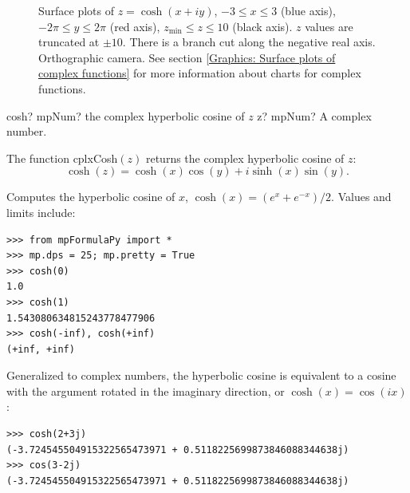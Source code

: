 \begin{figure}[ht]%
	\centering
	\qquad
	\caption[Complex Hyperbolic Cosine]{Surface plots of $z = \cosh(x + iy)$, $-3 \leq x \leq 3$ (blue axis), $-2 \pi \leq y \leq 2\pi$ (red axis), $z_{\text{min}} \leq z \leq 10$ (black axis). $z$ values are truncated at $\pm 10$. There is a branch cut along the negative real axis. Orthographic camera. See section \ref{Graphics: Surface plots of complex functions} for more information about charts for complex functions.} 
	\label{fig:Complex Hyperbolic Cosine}%
\end{figure}


\begin{mpFunctionsExtract}
	\mpFunctionOne
	{cosh? mpNum? the complex hyperbolic cosine of $z$}
	{z? mpNum? A complex number.}
\end{mpFunctionsExtract}

\vspace{0.3cm}
The function \textsf{cplxCosh$(z)$} returns the complex hyperbolic cosine of $z$: 
\begin{equation}
	\cosh(z) = \cosh(x) \cos(y) + i \sinh(x) \sin(y).
\end{equation}

Computes the hyperbolic cosine of $x$, $\cosh(x) = (e^x+e^{-x})/2$. Values and limits include:

\begin{lstlisting}
>>> from mpFormulaPy import *
>>> mp.dps = 25; mp.pretty = True
>>> cosh(0)
1.0
>>> cosh(1)
1.543080634815243778477906
>>> cosh(-inf), cosh(+inf)
(+inf, +inf)
\end{lstlisting}

Generalized to complex numbers, the hyperbolic cosine is equivalent to a cosine with the argument rotated in the imaginary direction, or $\cosh(x)=\cos(ix)$:

\begin{lstlisting}
>>> cosh(2+3j)
(-3.724545504915322565473971 + 0.5118225699873846088344638j)
>>> cos(3-2j)
(-3.724545504915322565473971 + 0.5118225699873846088344638j)
\end{lstlisting}



